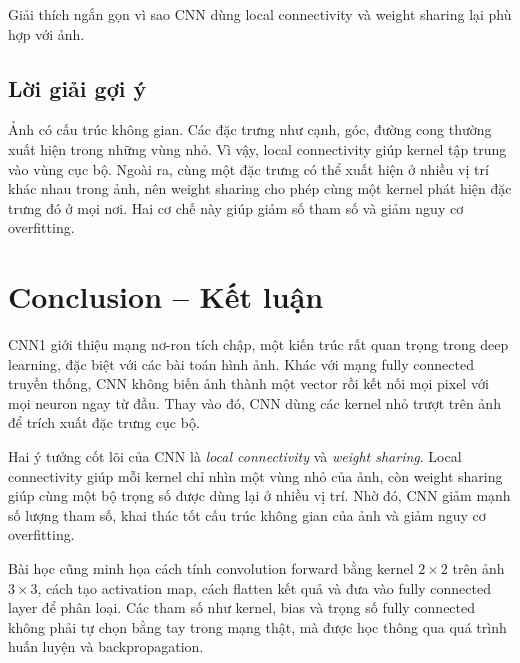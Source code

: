 Giải thích ngắn gọn vì sao CNN dùng local connectivity và weight sharing lại phù hợp với ảnh.

\subsection*{Lời giải gợi ý}

Ảnh có cấu trúc không gian. Các đặc trưng như cạnh, góc, đường cong thường xuất hiện trong những vùng nhỏ. Vì vậy, local connectivity giúp kernel tập trung vào vùng cục bộ. Ngoài ra, cùng một đặc trưng có thể xuất hiện ở nhiều vị trí khác nhau trong ảnh, nên weight sharing cho phép cùng một kernel phát hiện đặc trưng đó ở mọi nơi. Hai cơ chế này giúp giảm số tham số và giảm nguy cơ overfitting.

\section*{Conclusion -- Kết luận}

CNN1 giới thiệu mạng nơ-ron tích chập, một kiến trúc rất quan trọng trong deep learning, đặc biệt với các bài toán hình ảnh. Khác với mạng fully connected truyền thống, CNN không biến ảnh thành một vector rồi kết nối mọi pixel với mọi neuron ngay từ đầu. Thay vào đó, CNN dùng các kernel nhỏ trượt trên ảnh để trích xuất đặc trưng cục bộ.

Hai ý tưởng cốt lõi của CNN là \textit{local connectivity} và \textit{weight sharing}. Local connectivity giúp mỗi kernel chỉ nhìn một vùng nhỏ của ảnh, còn weight sharing giúp cùng một bộ trọng số được dùng lại ở nhiều vị trí. Nhờ đó, CNN giảm mạnh số lượng tham số, khai thác tốt cấu trúc không gian của ảnh và giảm nguy cơ overfitting.

Bài học cũng minh họa cách tính convolution forward bằng kernel $2\times2$ trên ảnh $3\times3$, cách tạo activation map, cách flatten kết quả và đưa vào fully connected layer để phân loại. Các tham số như kernel, bias và trọng số fully connected không phải tự chọn bằng tay trong mạng thật, mà được học thông qua quá trình huấn luyện và backpropagation.